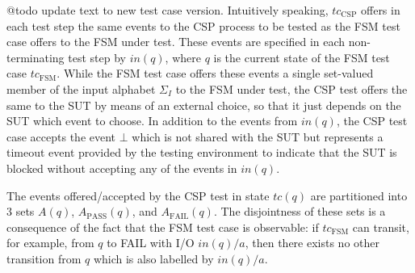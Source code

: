 
@todo update text to new test case version.
Intuitively speaking, $tc_\text{CSP}$ offers in each test step the same events to
the CSP process to be tested as the FSM test case offers to the FSM under test.
These events are specified in each non-terminating test step by $in(q)$, where
$q$ is the current state of the FSM test case $tc_\text{FSM}$. While the FSM test
case offers these events a single set-valued member of the input alphabet $\Sigma_I$
to the FSM under test, the CSP test offers the same to the SUT by means of an external choice, so that it just depends on the SUT which event to choose. In addition to the
events from $in(q)$, the CSP test case
accepts the event $\bot$ which is not shared with
the SUT but represents a timeout event provided by the testing environment to indicate
that the SUT is blocked without accepting any of the events in $in(q)$.

The events offered/accepted by the CSP test in state $tc(q)$ are partitioned into
3 sets $A(q)$, $A_\text{PASS}(q)$, and $A_\text{FAIL}(q)$. The disjointness of these
sets is a consequence of the fact that the FSM test case is observable: if
$tc_\text{FSM}$ can transit, for example, from $q$ to FAIL with I/O $in(q)/a$,
then there exists no other transition from $q$ which is also
labelled by $in(q)/a$.



